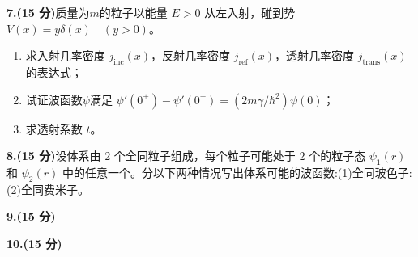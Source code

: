 \textbf{7.(15 分)}质量为$m$的粒子以能量 $E > 0$ 从左入射，碰到势 $V(x) = y\delta(x) \quad (y > 0)$。

\begin{enumerate}
    \item 求入射几率密度 $j_{\text{inc}}(x)$，反射几率密度 $j_{\text{ref}}(x)$，透射几率密度 $j_{\text{trans}}(x)$ 的表达式；
    \item 试证波函数$\psi$满足 $\psi'(0^+) - \psi'(0^-) = \left(2m\gamma/\hbar^2\right) \psi(0)$；
    \item 求透射系数 $t$。
\end{enumerate}

\textbf{8.(15 分)}设体系由 $2$ 个全同粒子组成，每个粒子可能处于 $2$ 个的粒子态 $\psi_1(r)$ 和 $\psi_2(r)$ 中的任意一个。分以下两种情况写出体系可能的波函数:(1)全同玻色子:(2)全同费米子。

\textbf{9.(15 分)}

\textbf{10.(15 分)}